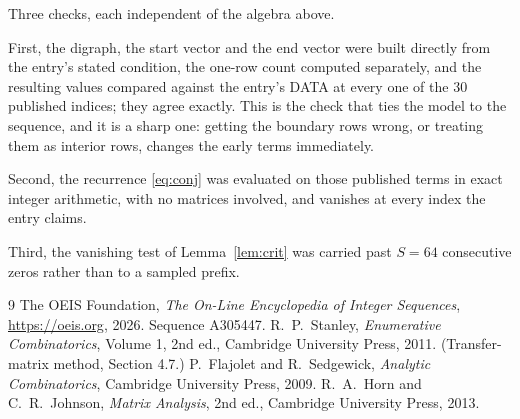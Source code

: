 \documentclass[11pt,a4paper]{article}
\theoremstyle{plain}
\theoremstyle{definition}
\begin{document}
Three checks, each independent of the algebra above.

First, the digraph, the start vector and the end vector were built directly from the
entry's stated condition, the one-row count computed separately, and the resulting values
compared against the entry's DATA at every one of the $30$ published indices; they
agree exactly. This is the check that ties the model to the sequence, and it is a sharp one:
getting the boundary rows wrong, or treating them as interior rows, changes the early terms
immediately.

Second, the recurrence \eqref{eq:conj} was evaluated on those published terms in exact
integer arithmetic, with no matrices involved, and vanishes at every index the entry claims.

Third, the vanishing test of Lemma~\ref{lem:crit} was carried past $S=64$ consecutive
zeros rather than to a sampled prefix.

\begin{thebibliography}{9}
 The OEIS Foundation, \emph{The On-Line Encyclopedia of Integer
Sequences}, \url{https://oeis.org}, 2026. Sequence A305447.
 R.~P.~Stanley, \emph{Enumerative Combinatorics}, Volume 1, 2nd ed.,
Cambridge University Press, 2011. (Transfer-matrix method, Section 4.7.)
 P.~Flajolet and R.~Sedgewick, \emph{Analytic Combinatorics}, Cambridge
University Press, 2009.
 R.~A.~Horn and C.~R.~Johnson, \emph{Matrix Analysis}, 2nd ed., Cambridge
University Press, 2013.
\end{thebibliography}
\end{document}
